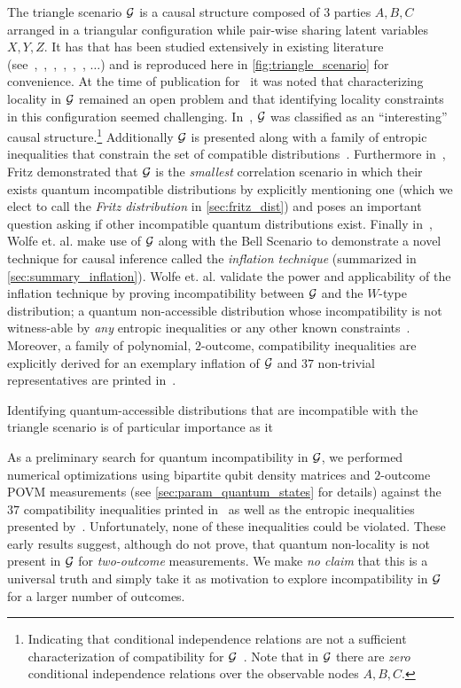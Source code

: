\documentclass[aps, 10pt, english, twoside, pra, nofootinbib, longbibliography]{revtex4-1}
\begin{document}
    The triangle scenario ${\mathcal{G}}$ is a causal structure composed of $3$ parties $A, B, C$ arranged in a triangular configuration while pair-wise sharing latent variables $X, Y, Z$. It has that has been studied extensively in existing literature (see~\cite[Fig. 1]{Steudel_2010},~\cite[Fig. 6]{Chaves_2014},~\cite[Fig. 8]{Branciard_2012},~\cite[Fig. 8, Appendix E]{Henson_2014},~\cite[Fig. 3]{Fritz_2012},~\cite[Fig. 1]{Inflation}, $\ldots$) and is reproduced here in \cref{fig:triangle_scenario} for convenience. At the time of publication for~\cite{Branciard_2012} it was noted that characterizing locality in ${\mathcal{G}}$ remained an open problem and that identifying locality constraints in this configuration seemed challenging. In~\cite{Henson_2014}, ${\mathcal{G}}$ was classified as an ``interesting'' causal structure.\footnote{Indicating that conditional independence relations are not a sufficient characterization of compatibility for ${\mathcal{G}}$~\cite{Henson_2014}. Note that in ${\mathcal{G}}$ there are \textit{zero} conditional independence relations over the observable nodes $A, B, C$.} Additionally ${\mathcal{G}}$ is presented along with a family of entropic inequalities that constrain the set of compatible distributions~\cite{Henson_2014}. Furthermore in~\cite{Fritz_2012}, Fritz demonstrated that ${\mathcal{G}}$ is the \textit{smallest} correlation scenario in which their exists quantum incompatible distributions by explicitly mentioning one (which we elect to call the \textit{Fritz distribution} in \cref{sec:fritz_dist}) and poses an important question asking if other incompatible quantum distributions exist. Finally in~\cite{Inflation}, Wolfe et. al. make use of ${\mathcal{G}}$ along with the Bell Scenario to demonstrate a novel technique for causal inference called the \textit{inflation technique} (summarized in \cref{sec:summary_inflation}). Wolfe et. al. validate the power and applicability of the inflation technique by proving incompatibility between ${\mathcal{G}}$ and the $W$-type distribution; a quantum non-accessible distribution whose incompatibility is not witness-able by \textit{any} entropic inequalities or any other known constraints~\cite{Inflation}. Moreover, a family of polynomial, $2$-outcome, compatibility inequalities are explicitly derived for an exemplary inflation of ${\mathcal{G}}$ and $37$ non-trivial representatives are printed in~\cite{Inflation}.

    Identifying quantum-accessible distributions that are incompatible with the triangle scenario is of particular importance as it 

    As a preliminary search for quantum incompatibility in ${\mathcal{G}}$, we performed numerical optimizations using bipartite qubit density matrices and $2$-outcome POVM measurements (see \cref{sec:param_quantum_states} for details) against the $37$ compatibility inequalities printed in~\cite{Inflation} as well as the entropic inequalities presented by~\cite{Henson_2014}. Unfortunately, none of these inequalities could be violated. These early results suggest, although do not prove, that quantum non-locality is not present in ${\mathcal{G}}$ for \textit{two-outcome} measurements. We make \textit{no claim} that this is a universal truth and simply take it as motivation to explore incompatibility in ${\mathcal{G}}$ for a larger number of outcomes.
\end{document}
